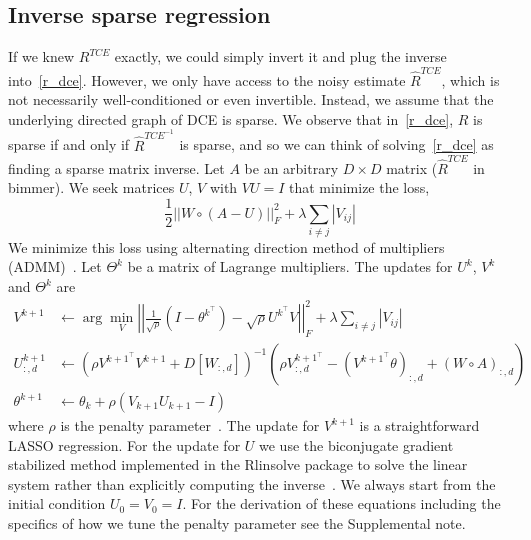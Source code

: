 \documentclass{article}
\begin{document}
\subsection{Inverse sparse regression}
If we knew $R^{TCE}$ exactly, we could simply invert it and plug the inverse
into~\eqref{r_dce}. However, we only have access to the noisy estimate $\hat{R}^{TCE}$,
which is not necessarily well-conditioned or even invertible. Instead, we assume that
the underlying directed graph of DCE is sparse. We observe that in~\eqref{r_dce}, $R$ is
sparse if and only if $\hat{R}^{TCE^{-1}}$ is sparse, and so we can think of
solving~\eqref{r_dce} as finding a sparse matrix inverse. Let $A$ be an arbitrary $D\times D$
matrix ($\hat{R}^{TCE}$ in bimmer). We seek matrices $U$, $V$ with $VU=I$ that minimize the loss,
\begin{equation}\label{opt_methods}
\frac{1}{2} ||W \circ (A - U)||_F^2 + \lambda \sum_{i\neq j}|V_{ij}|
\end{equation}
We minimize this loss using alternating direction method of multipliers (ADMM)~\cite{Boyd2010}.
Let $\Theta^k$ be a matrix of Lagrange multipliers. The updates for $U^k$, $V^k$ and $\Theta^k$
are
\begin{align}
V^{k+1} &\leftarrow \arg \min_{V} \left|\left|\frac{1}{\sqrt{\rho}}\left(I-\theta^{k^\top}\right) -
      \sqrt{\rho} U^{k^\top} V\right|\right|_F^2 + \lambda \sum_{i\neq j} \left|V_{ij} \right| \\
U_{:, d}^{k+1} &\leftarrow \left(\rho V^{k+1 ^ \top} V^{k+1} + D[W_{:, d}]\right)^{-1} \left(\rho V^{k+1 ^ \top}_{:, d} -
  \left(V^{k+1 ^ \top} \theta\right)_{:, d} + (W \circ A)_{:, d}\right) \\
\theta^{k+1} &\leftarrow \theta_{k} + \rho(V_{k+1}U_{k+1}-I)
\end{align}
where $\rho$ is the penalty parameter~\cite{Boyd2010}.
The update for $V^{k+1}$ is a straightforward LASSO regression. For the update for $U$ 
we use the biconjugate gradient stabilized method implemented
in the Rlinsolve package to solve the linear system
rather than explicitly computing the inverse~\cite{You2018}.
We always start from the initial condition $U_0 = V_0 = I$.
 For the derivation of these equations including
the specifics of how we tune
the penalty parameter see the Supplemental note.
\end{document}
